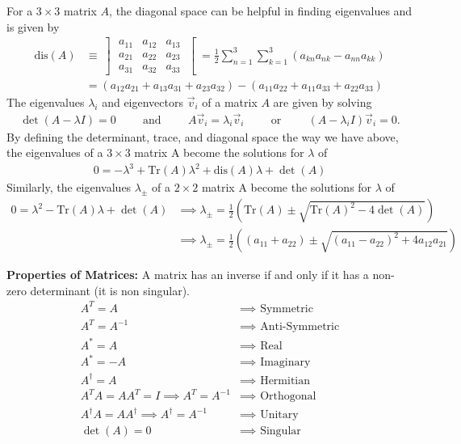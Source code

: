 For a $3\times 3$ matrix $A$, the diagonal space can be helpful in finding eigenvalues and is given by
\begin{align}
	\textrm{dis}(A) &\equiv \left] \begin{array}{ccc}
		a_{11} & a_{12} & a_{13} \\
		a_{21} & a_{22} & a_{23} \\
		a_{31} & a_{32} & a_{33}
	\end{array} \right[  = \frac{1}{2}\sum_{n=1}^{3}\sum_{k=1}^{3}\left(a_{kn}a_{nk}-a_{nn}a_{kk}\right)\\
	&= (a_{12}a_{21}+a_{13}a_{31}+a_{23}a_{32})-(a_{11}a_{22}+a_{11}a_{33}+a_{22}a_{33})
\end{align}
The eigenvalues $\lambda_i$ and eigenvectors $\vec{v}_i$ of a matrix $A$ are given by solving 
\begin{align}
	\det(A-\lambda I)=0	\hspace{1cm}\textrm{and}\hspace{1cm}A\vec{v}_i=\lambda_i\vec{v}_i\hspace{1cm}\textrm{or}\hspace{1cm}(A-\lambda_i I)\vec{v}_i=0.
\end{align}
By defining the determinant, trace, and diagonal space the way we have above, the eigenvalues of a $3 \times 3$ matrix A become the solutions for $\lambda$ of
\begin{align}
	0=-\lambda^3 + \textrm{Tr}(A) \lambda^2 + \textrm{dis}(A) \lambda + \det(A)
\end{align}
Similarly, the eigenvalues $\lambda_\pm$ of a $2 \times 2$ matrix A become the solutions for $\lambda$ of
\begin{align}
	0=\lambda^2 - \textrm{Tr}(A) \lambda + \det(A) &\implies \lambda_\pm = \frac{1}{2}\left(\textrm{Tr}(A)\pm\sqrt{\textrm{Tr}(A)^2-4\det(A)}\right) \\
	&\implies \lambda_\pm = \frac{1}{2}\left((a_{11}+a_{22})\pm\sqrt{(a_{11}-a_{22})^2+4a_{12}a_{21}}\right)
\end{align}

\textbf{Properties of Matrices: } A matrix has an inverse if and only if it has a non-zero determinant (it is non singular). 
\begin{align}
	A^T=A &\implies \textrm{ Symmetric} \\
	A^T=A^{-1} &\implies \textrm{ Anti-Symmetric} \\
	A^*=A &\implies \textrm{ Real} \\
	A^*=-A &\implies \textrm{ Imaginary} \\
	A^\dagger=A &\implies \textrm{ Hermitian} \\
	A^TA=AA^T=I \implies A^T=A^{-1} &\implies \textrm{ Orthogonal} \\
	A^\dagger A=AA^\dagger \implies A^\dagger = A^{-1} &\implies \textrm{ Unitary} \\
	\det(A)=0 &\implies \textrm{ Singular}
\end{align}